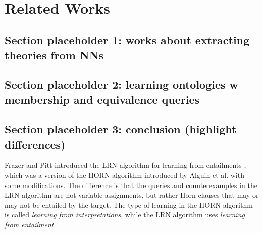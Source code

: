 \chapter{Related Works}

\section{Section placeholder 1: works about extracting theories from NNs}

\section{Section placeholder 2: learning ontologies w membership and equivalence queries}

\section{Section placeholder 3: conclusion (highlight differences)}

Frazer and Pitt introduced the LRN algorithm for learning from entailments \cite{DBLP:conf/icml/FrazierP93}, which was a version of the HORN algorithm introduced by Alguin et al. \cite{DBLP:journals/ml/AngluinFP92} with some modifications. The difference is that the queries and counterexamples in the LRN algorithm are not variable assignments, but rather Horn clauses that may or may not be entailed by the target. The type of learning in the HORN algorithm is called \emph{learning from interpretations}, while the LRN algorithm uses \emph{learning from entailment}.

